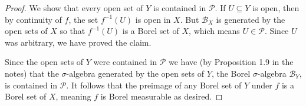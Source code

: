 \documentclass[11pt]{article}
\begin{document}
\begin{enumerate}
\begin{proof}
      We show that every open set of $Y$ is contained in $\mathscr{P}$. If $U\subseteq Y$ is open, then by continuity of $f$, the set $f^{-1}(U)$ is open in $X$. But $\mathscr{B}_X$ is generated by the open sets of $X$ so that $f^{-1}(U)$ is a Borel set of $X$, which means $U\in \mathscr{P}$. Since $U$ was arbitrary, we have proved the claim.

      Since the open sets of $Y$ were contained in $\mathscr{P}$ we have (by Proposition 1.9 in the notes) that the $\sigma$-algebra generated by the open sets of $Y$, the Borel $\sigma$-algebra $\mathscr{B}_Y$, is contained in $\mathscr{P}$. It follows that the preimage of any Borel set of $Y$ under $f$ is a Borel set of $X$, meaning $f$ is Borel measurable as desired.
    \end{proof}
\end{enumerate}
\end{document}
